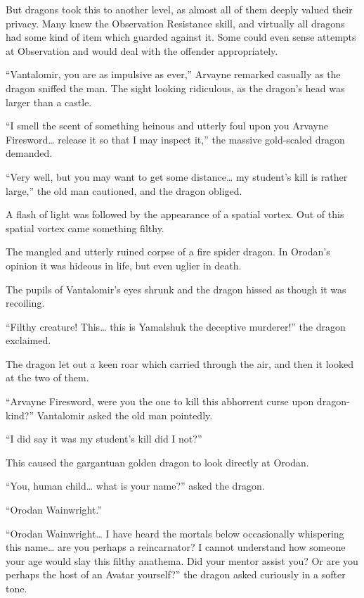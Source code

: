 \documentclass[a4paper,10pt]{book}
\begin{document}
But dragons took this to another level, as almost all of them deeply valued their privacy. Many knew the Observation Resistance skill, and virtually all dragons had some kind of item which guarded against it. Some could even sense attempts at Observation and would deal with the offender appropriately.\par
“Vantalomir, you are as impulsive as ever,” Arvayne remarked casually as the dragon sniffed the man. The sight looking ridiculous, as the dragon’s head was larger than a castle.\par
“I smell the scent of something heinous and utterly foul upon you Arvayne Firesword… release it so that I may inspect it,” the massive gold-scaled dragon demanded.\par
“Very well, but you may want to get some distance… my student’s kill is rather large,” the old man cautioned, and the dragon obliged.\par
A flash of light was followed by the appearance of a spatial vortex. Out of this spatial vortex came something filthy.\par
The mangled and utterly ruined corpse of a fire spider dragon. In Orodan’s opinion it was hideous in life, but even uglier in death.\par
The pupils of Vantalomir’s eyes shrunk and the dragon hissed as though it was recoiling.\par
“Filthy creature! This… this is Yamalshuk the deceptive murderer!” the dragon exclaimed.\par
The dragon let out a keen roar which carried through the air, and then it looked at the two of them.\par
“Arvayne Firesword, were you the one to kill this abhorrent curse upon dragon-kind?” Vantalomir asked the old man pointedly.\par
“I did say it was my student’s kill did I not?”\par
This caused the gargantuan golden dragon to look directly at Orodan.\par
“You, human child… what is your name?” asked the dragon.\par
“Orodan Wainwright.”\par
“Orodan Wainwright… I have heard the mortals below occasionally whispering this name… are you perhaps a reincarnator? I cannot understand how someone your age would slay this filthy anathema. Did your mentor assist you? Or are you perhaps the host of an Avatar yourself?” the dragon asked curiously in a softer tone.\par
\end{document}
